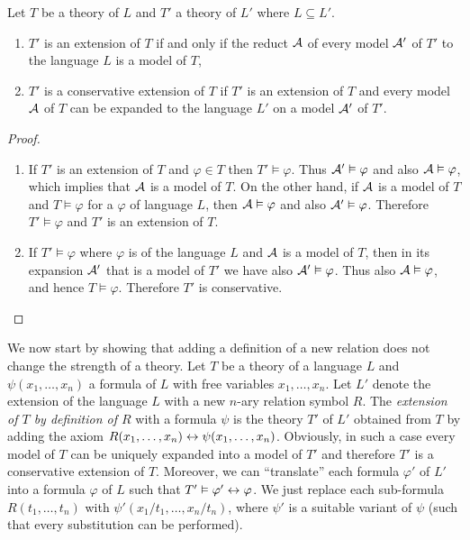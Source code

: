 \begin{lemma}
Let $T$ be a theory of $L$ and $T'$ a theory of $L'$ where $L \subseteq L'$.
\begin{enumerate}
	\item $T'$ is an extension of $T$ if and only if the reduct $\mathcal{A}$ of every model $\mathcal{A}'$ of $T'$ to the language $L$ is a model of $T$,
	\item $T'$ is a conservative extension of $T$ if $T'$ is an extension of $T$ and every model $\mathcal{A}$ of $T$ can be expanded to the language $L'$ on a model $\mathcal{A}'$ of $T'$.
\end{enumerate}
\end{lemma}
\begin{proof}
\begin{enumerate}
  \item If $T'$ is an extension of $T$ and $\varphi \in T$ then $T' \vDash \varphi$. Thus $\mathcal{A}' \vDash \varphi$ and also $\mathcal{A} \vDash \varphi$, which implies that $\mathcal{A}$ is a model of $T$. On the other hand, if $\mathcal{A}$ is a model of $T$ and $T \vDash \varphi$ for a $\varphi$ of language $L$, then $\mathcal{A} \vDash \varphi$ and also $\mathcal{A}' \vDash \varphi$. Therefore $T' \vDash \varphi$ and $T'$ is an extension of $T$.
  \item If $T' \vDash \varphi$ where $\varphi$ is of the language $L$ and $\mathcal{A}$ is a model of $T$, then in its expansion $\mathcal{A}'$ that is a model of $T'$ we have also $\mathcal{A}' \vDash \varphi$. Thus also $\mathcal{A} \vDash \varphi$, and hence $T \vDash \varphi$. Therefore $T'$ is conservative.
\end{enumerate}
\vspace{-\baselineskip}
\end{proof}

We now start by showing that adding a definition of a new relation does not change the strength of a theory. Let $T$ be a theory of a language $L$ and $\psi(x_1, \dots, x_n)$ a formula of $L$ with free variables $x_1, \dots, x_n$. Let $L'$ denote the extension of the language $L$ with a new $n$-ary relation symbol $R$. The \emph{extension of $T$ by definition of $R$} with a formula $\psi$ is the theory $T'$ of $L'$ obtained from $T$ by adding the axiom $R(x_1, \dots, x_n) \leftrightarrow \psi(x_1, \dots, x_n)$. Obviously, in such a case every model of $T$ can be uniquely expanded into a model of $T'$ and therefore $T'$ is a conservative extension of $T$. Moreover, we can ``translate'' each formula $\varphi'$ of $L'$ into a formula $\varphi$ of $L$ such that $T' \vDash \varphi' \leftrightarrow \varphi$. We just replace each sub-formula $R(t_1, \dots, t_n)$ with $\psi'(x_1/t_1, \dots, x_n/t_n)$, where $\psi'$ is a suitable variant of $\psi$ (such that every substitution can be performed).

